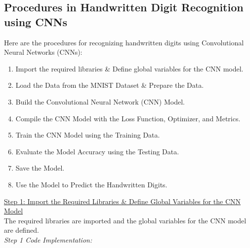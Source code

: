 \documentclass{book}
\begin{document}
\subsection{Procedures in Handwritten Digit Recognition using CNNs}
Here are the procedures for recognizing handwritten digits using Convolutional Neural Networks (CNNs):
\begin{enumerate}
    \item Import the required libraries \& Define global variables for the CNN model.
    \item Load the Data from the MNIST Dataset \& Prepare the Data.
    \item Build the Convolutional Neural Network (CNN) Model.
    \item Compile the CNN Model with the Loss Function, Optimizer, and Metrics.
    \item Train the CNN Model using the Training Data.
    \item Evaluate the Model Accuracy using the Testing Data.
    \item Save the Model.
    \item Use the Model to Predict the Handwritten Digits.
\end{enumerate}
\uline{Step 1: Import the Required Libraries \& Define Global Variables for the CNN Model}\\
\vspace{1mm}
The required libraries are imported and the global variables for the CNN model are defined.\\
\vspace{3mm}
\textit{\large Step 1 Code Implementation:}\\
\end{document}

